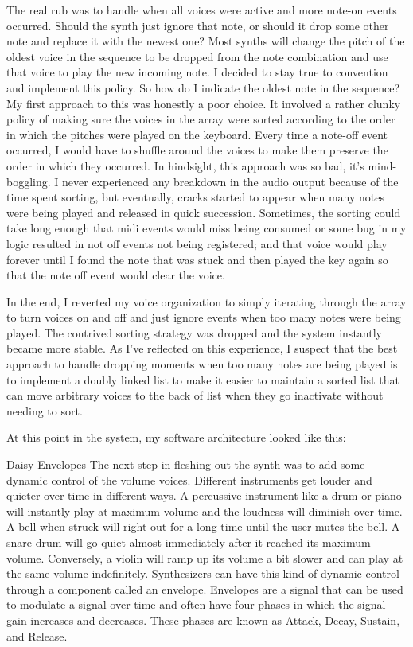 \documentclass[acmlarge,screen]{acmart}
\begin{document}
The real rub was to handle when all voices were active and more note-on events occurred. Should the synth just ignore that note, or should it drop some other note and replace it with the newest one? Most synths will change the pitch of the oldest voice in the sequence to be dropped from the note combination and use that voice to play the new incoming note. I decided to stay true to convention and implement this policy. So how do I indicate the oldest note in the sequence? My first approach to this was honestly a poor choice. It involved a rather clunky policy of making sure the voices in the array were sorted according to the order in which the pitches were played on the keyboard. Every time a note-off event occurred, I would have to shuffle around the voices to make them preserve the order in which they occurred. In hindsight, this approach was so bad, it's mind-boggling. I never experienced any breakdown in the audio output because of the time spent sorting, but eventually, cracks started to appear when many notes were being played and released in quick succession. Sometimes, the sorting could take long enough that midi events would miss being consumed or some bug in my logic resulted in not off events not being registered; and that voice would play forever until I found the note that was stuck and then played the key again so that the note off event would clear the voice.

In the end, I reverted my voice organization to simply iterating through the array to turn voices on and off and just ignore events when too many notes were being played. The contrived sorting strategy was dropped and the system instantly became more stable. As I've reflected on this experience, I suspect that the best approach to handle dropping moments when too many notes are being played is to implement a doubly linked list to make it easier to maintain a sorted list that can move arbitrary voices to the back of list when they go inactivate without needing to sort.

At this point in the system, my software architecture looked like this:

Daisy
Envelopes
The next step in fleshing out the synth was to add some dynamic control of the volume voices. Different instruments get louder and quieter over time in different ways. A percussive instrument like a drum or piano will instantly play at maximum volume and the loudness will diminish over time. A bell when struck will right out for a long time until the user mutes the bell. A snare drum will go quiet almost immediately after it reached its maximum volume. Conversely, a violin will ramp up its volume a bit slower and can play at the same volume indefinitely. Synthesizers can have this kind of dynamic control through a component called an envelope. Envelopes are a signal that can be used to modulate a signal over time and often have four phases in which the signal gain increases and decreases. These phases are known as Attack, Decay, Sustain, and Release.
\end{document}
